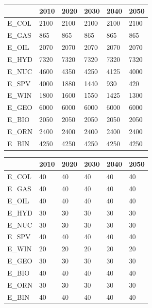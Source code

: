 \documentclass[10pt,a4paper,titlepage,dvipdfmx]{book}
\begin{document}
\begin{tabularx}{\textwidth}{|
p{}|
p{}|
p{}|
p{}|
p{}|
p{}|} 
\caption{\label{tab:IniInvCos}Initial investment cost (\$/MW)} \\
\hline 
  & 2010 & 2020 & 2030 & 2040 & 2050 \\\hline 
E\_COL & 2100 & 2100 & 2100 & 2100 & 2100 \\\hline 
E\_GAS & 865 & 865 & 865 & 865 & 865 \\\hline 
E\_OIL & 2070 & 2070 & 2070 & 2070 & 2070 \\\hline 
E\_HYD & 7320 & 7320 & 7320 & 7320 & 7320 \\\hline 
E\_NUC & 4600 & 4350 & 4250 & 4125 & 4000 \\\hline 
E\_SPV & 4000 & 1880 & 1440 & 930 & 420 \\\hline 
E\_WIN & 1800 & 1600 & 1550 & 1425 & 1300 \\\hline 
E\_GEO & 6000 & 6000 & 6000 & 6000 & 6000 \\\hline 
E\_BIO & 2050 & 2050 & 2050 & 2050 & 2050 \\\hline 
E\_ORN & 2400 & 2400 & 2400 & 2400 & 2400 \\\hline 
E\_BIN & 4250 & 4250 & 4250 & 4250 & 4250 \\\hline 
\end{tabularx}

\begin{tabularx}{\textwidth}{|
p{}|
p{}|
p{}|
p{}|
p{}|
p{}|}
\caption{\label{tab:LifTim}Life time (year)} \\
 \hline 
  & 2010 & 2020 & 2030 & 2040 & 2050 \\\hline 
E\_COL & 40 & 40 & 40 & 40 & 40 \\\hline 
E\_GAS & 40 & 40 & 40 & 40 & 40 \\\hline 
E\_OIL & 40 & 40 & 40 & 40 & 40 \\\hline 
E\_HYD & 30 & 30 & 30 & 30 & 30 \\\hline 
E\_NUC & 30 & 30 & 30 & 30 & 30 \\\hline 
E\_SPV & 40 & 40 & 40 & 40 & 40 \\\hline 
E\_WIN & 20 & 20 & 20 & 20 & 20 \\\hline 
E\_GEO & 30 & 30 & 30 & 30 & 30 \\\hline 
E\_BIO & 40 & 40 & 40 & 40 & 40 \\\hline 
E\_ORN & 30 & 30 & 30 & 30 & 30 \\\hline 
E\_BIN & 40 & 40 & 40 & 40 & 40 \\\hline 
\end{tabularx}
\end{document}
